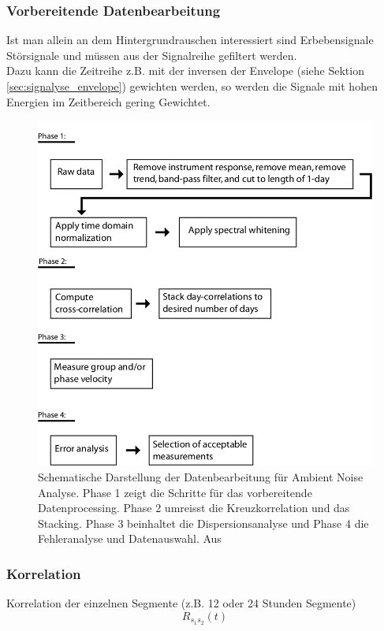 \subsubsection*{Vorbereitende Datenbearbeitung}
Ist man allein an dem Hintergrundrauschen interessiert sind Erbebensignale Störsignale und müssen aus der Signalreihe gefiltert werden.\\
Dazu kann die Zeitreihe z.B. mit der inversen der Envelope (siehe Sektion \ref{sec:signalyse_envelope}) gewichten werden, so werden die Signale mit hohen Energien im Zeitbereich gering Gewichtet.
\begin{figure}
\centering
\includegraphics[width=.9\tw]{fig/07-Korrelation/ambient_noise-sketch.png}
\caption{Schematische Darstellung der Datenbearbeitung für Ambient Noise Analyse. Phase 1 zeigt die Schritte für das vorbereitende Datenprocessing. Phase 2 umreisst die Kreuzkorrelation und das Stacking. Phase 3 beinhaltet die Dispersionsanalyse und Phase 4 die Fehleranalyse und Datenauswahl. Aus \cite{bensen_2007}}
\end{figure}

\subsubsection*{Korrelation}
Korrelation der einzelnen Segmente (z.B. 12 oder 24 Stunden Segmente)
\[
R_{s_1 s_2}(t)
\]

